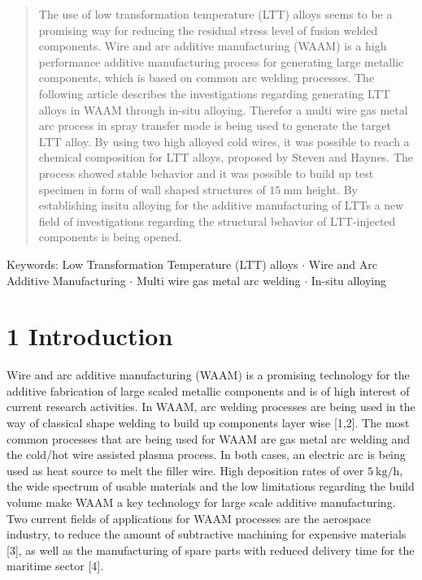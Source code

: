 \documentclass[10pt]{article}
\begin{document}
\begin{abstract}
The use of low transformation temperature (LTT) alloys seems to be a promising way for reducing the residual stress level of fusion welded components. Wire and arc additive manufacturing (WAAM) is a high performance additive manufacturing process for generating large metallic components, which is based on common arc welding processes. The following article describes the investigations regarding generating LTT alloys in WAAM through in-situ alloying. Therefor a multi wire gas metal arc process in spray transfer mode is being used to generate the target LTT alloy. By using two high alloyed cold wires, it was possible to reach a chemical composition for LTT alloys, proposed by Steven and Haynes. The process showed stable behavior and it was possible to build up test specimen in form of wall shaped structures of $15 \mathrm{~mm}$ height. By establishing insitu alloying for the additive manufacturing of LTTs a new field of investigations regarding the structural behavior of LTT-injected components is being opened.
\end{abstract}

Keywords: Low Transformation Temperature (LTT) alloys $\cdot$ Wire and Arc Additive Manufacturing $\cdot$ Multi wire gas metal arc welding $\cdot$ In-situ alloying

\section*{1 Introduction}
Wire and arc additive manufacturing (WAAM) is a promising technology for the additive fabrication of large scaled metallic components and is of high interest of current research activities. In WAAM, arc welding processes are being used in the way of classical shape welding to build up components layer wise [1,2]. The most common processes that are being used for WAAM are gas metal arc welding and the cold/hot wire assisted plasma process. In both cases, an electric arc is being used as heat source to melt the filler wire. High deposition rates of over $5 \mathrm{~kg} / \mathrm{h}$, the wide spectrum of usable materials and the low limitations regarding the build volume make WAAM a key technology for large scale additive manufacturing. Two current fields of applications for WAAM processes are the aerospace industry, to reduce the amount of subtractive machining for expensive materials [3], as well as the manufacturing of spare parts with reduced delivery time for the maritime sector [4].
\end{document}
